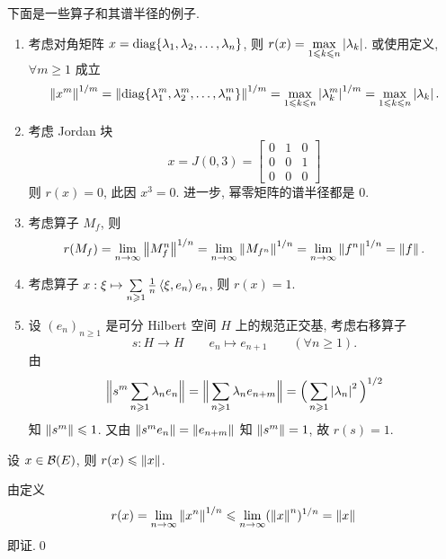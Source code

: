 	\begin{Example}
		下面是一些算子和其谱半径的例子.
		\begin{enumerate}[(1)]
			\item 考虑对角矩阵 $ x=\operatorname{diag}\{ \lambda_{1}, \lambda_{2}, \dots, \lambda_{n} \} $, 则 $ r(x)=\max\limits_{1\leqslant k\leqslant n}\left| \lambda_{k} \right|  $. 或使用定义, $ \forall m\geqslant1 $ 成立
			\[
				\left\| x^{m} \right\|^{1/m}=\left\| \operatorname{diag}\{ \lambda^{m}_{1}, \lambda^{m}_{2}, \dots, \lambda^{m}_{n} \} \right\|^{1/m}=\max_{1\leqslant k\leqslant n}\left| \lambda_{k}^{m} \right| ^{1/m}=\max_{1\leqslant k\leqslant n}\left| \lambda_{k} \right| .
			\]
			\item 考虑 Jordan 块
			\[
				x = J(0, 3)=\begin{bmatrix}
					0 & 1 & 0\\
					0 & 0 & 1\\
					0 & 0 & 0
				\end{bmatrix}
			\]
			则 $ r(x)=0 $, 此因 $ x^{3}=0 $. 进一步, 幂零矩阵的谱半径都是 0.
			\item 考虑算子 $ M_{f} $, 则
			\[
				r(M_{f}) = \lim_{n\to\infty}\left\| M_{f}^{n} \right\|^{1/n}=\lim_{n\to\infty}\left\| M_{f^{n}} \right\|^{1/n}=\lim_{n\to\infty}\left\| f^{n} \right\|^{1/n}=\left\| f \right\|.
			\]
			\item 考虑算子 $ x: \xi\mapsto\sum\limits_{n\geqslant1}\frac{1}{n}\left\langle \xi, e_{n} \right\rangle e_{n} $, 则 $ r(x)=1 $.
			\item 设 $ (e_{n})_{n\geqslant1} $ 是可分 Hilbert 空间 $ H $ 上的规范正交基, 考虑右移算子
			\[
				s: H\to H\qquad e_{n}\mapsto e_{n+1}\qquad (\forall n\geqslant1).
			\]
			由
			\[
				\Big\| s^{m}\sum_{n\geqslant1}\lambda_{n}e_{n} \Big\|=\Big\| \sum_{n\geqslant1}\lambda_{n}e_{n+m} \Big\|=\Big( \sum_{n\geqslant1}\left| \lambda_{n} \right| ^{2} \Big)^{1/2}
			\]
			知 $ \left\| s^{m} \right\|\leqslant1 $. 又由 $ \left\| s^{m}e_{n} \right\|=\left\| e_{n+m} \right\| $ 知 $ \left\| s^{m} \right\|=1 $, 故 $ r(s)=1 $. 
		\end{enumerate}
	\end{Example}

	\begin{Corollary}
		设 $ x\in\mathcal{B}(E) $, 则 $ r(x)\leqslant\left\| x \right\| $.
	\end{Corollary}
	\begin{Proof}
		由定义
		\[
			r(x)=\lim_{n\to\infty}\left\| x^{n} \right\|^{1/n}\leqslant\lim_{n\to\infty}(\left\| x \right\|^{n})^{1/n}=\left\| x \right\|
		\]
		即证.\qed
	\end{Proof}
	
